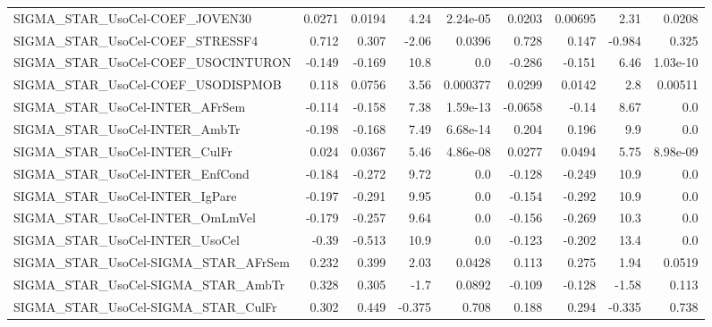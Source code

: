 \begin{tabular}{lrrrrrrrr}
SIGMA\_STAR\_UsoCel-COEF\_JOVEN30        &      0.0271 &       0.0194 &     4.24 & 2.24e-05 &     0.0203 &     0.00695 &         2.31 &        0.0208 \\
SIGMA\_STAR\_UsoCel-COEF\_STRESSF4       &       0.712 &        0.307 &    -2.06 &   0.0396 &      0.728 &       0.147 &       -0.984 &         0.325 \\
SIGMA\_STAR\_UsoCel-COEF\_USOCINTURON    &      -0.149 &       -0.169 &     10.8 &      0.0 &     -0.286 &      -0.151 &         6.46 &      1.03e-10 \\
SIGMA\_STAR\_UsoCel-COEF\_USODISPMOB     &       0.118 &       0.0756 &     3.56 & 0.000377 &     0.0299 &      0.0142 &          2.8 &       0.00511 \\
SIGMA\_STAR\_UsoCel-INTER\_AFrSem        &      -0.114 &       -0.158 &     7.38 & 1.59e-13 &    -0.0658 &       -0.14 &         8.67 &           0.0 \\
SIGMA\_STAR\_UsoCel-INTER\_AmbTr         &      -0.198 &       -0.168 &     7.49 & 6.68e-14 &      0.204 &       0.196 &          9.9 &           0.0 \\
SIGMA\_STAR\_UsoCel-INTER\_CulFr         &       0.024 &       0.0367 &     5.46 & 4.86e-08 &     0.0277 &      0.0494 &         5.75 &      8.98e-09 \\
SIGMA\_STAR\_UsoCel-INTER\_EnfCond       &      -0.184 &       -0.272 &     9.72 &      0.0 &     -0.128 &      -0.249 &         10.9 &           0.0 \\
SIGMA\_STAR\_UsoCel-INTER\_IgPare        &      -0.197 &       -0.291 &     9.95 &      0.0 &     -0.154 &      -0.292 &         10.9 &           0.0 \\
SIGMA\_STAR\_UsoCel-INTER\_OmLmVel       &      -0.179 &       -0.257 &     9.64 &      0.0 &     -0.156 &      -0.269 &         10.3 &           0.0 \\
SIGMA\_STAR\_UsoCel-INTER\_UsoCel        &       -0.39 &       -0.513 &     10.9 &      0.0 &     -0.123 &      -0.202 &         13.4 &           0.0 \\
SIGMA\_STAR\_UsoCel-SIGMA\_STAR\_AFrSem   &       0.232 &        0.399 &     2.03 &   0.0428 &      0.113 &       0.275 &         1.94 &        0.0519 \\
SIGMA\_STAR\_UsoCel-SIGMA\_STAR\_AmbTr    &       0.328 &        0.305 &     -1.7 &   0.0892 &     -0.109 &      -0.128 &        -1.58 &         0.113 \\
SIGMA\_STAR\_UsoCel-SIGMA\_STAR\_CulFr    &       0.302 &        0.449 &   -0.375 &    0.708 &      0.188 &       0.294 &       -0.335 &         0.738 \\

\end{tabular}
